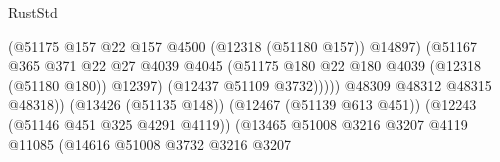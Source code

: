 \begin{lexlean}{RustStd}
\begin{coremodule}
                                                          (@51175
                                                            @157
                                                            @22
                                                            @157
                                                            @4500
                                                            (@12318 (@51180 @157))
                                                            @14897)
                                                          (@51167
                                                            @365
                                                            @371
                                                            @22
                                                            @27
                                                            @4039
                                                            @4045
                                                            (@51175
                                                              @180
                                                              @22
                                                              @180
                                                              @4039
                                                              (@12318 (@51180 @180))
                                                              @12397)
                                                            (@12437 @51109 @3732)))))
                                                    @48309
                                                    @48312
                                                    @48315
                                                    @48318))
                                                (@13426 (@51135 @148))
                                                (@12467 (@51139 @613 @451))
                                                (@12243 (@51146 @451 @325 @4291 @4119))
                                                (@13465
                                                  @51008
                                                  @3216
                                                  @3207
                                                  @4119
                                                  @11085
                                                  (@14616
                                                    @51008
                                                    @3732
                                                    @3216
                                                    @3207

\end{coremodule}
\end{lexlean}
